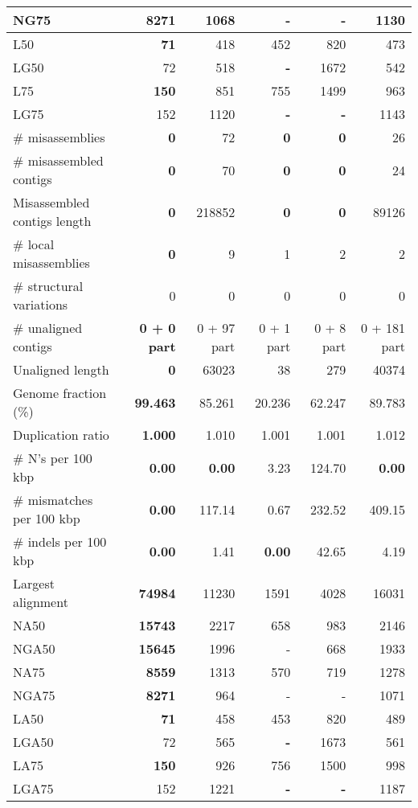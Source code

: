 \documentclass[12pt,a4paper]{article}
\begin{document}
\begin{table}[ht]
\begin{center}
\begin{tabular}{|l*{5}{|r}|}
NG75 & {\bf 8271} & 1068 & - & - & 1130 \\ \hline
L50 & {\bf 71} & 418 & 452 & 820 & 473 \\ \hline
LG50 & 72 & 518 & {\bf -} & 1672 & 542 \\ \hline
L75 & {\bf 150} & 851 & 755 & 1499 & 963 \\ \hline
LG75 & 152 & 1120 & {\bf -} & {\bf -} & 1143 \\ \hline
\# misassemblies & {\bf 0} & 72 & {\bf 0} & {\bf 0} & 26 \\ \hline
\# misassembled contigs & {\bf 0} & 70 & {\bf 0} & {\bf 0} & 24 \\ \hline
Misassembled contigs length & {\bf 0} & 218852 & {\bf 0} & {\bf 0} & 89126 \\ \hline
\# local misassemblies & {\bf 0} & 9 & 1 & 2 & 2 \\ \hline
\# structural variations & 0 & 0 & 0 & 0 & 0 \\ \hline
\# unaligned contigs & {\bf 0 + 0 part} & 0 + 97 part & 0 + 1 part & 0 + 8 part & 0 + 181 part \\ \hline
Unaligned length & {\bf 0} & 63023 & 38 & 279 & 40374 \\ \hline
Genome fraction (\%) & {\bf 99.463} & 85.261 & 20.236 & 62.247 & 89.783 \\ \hline
Duplication ratio & {\bf 1.000} & 1.010 & 1.001 & 1.001 & 1.012 \\ \hline
\# N's per 100 kbp & {\bf 0.00} & {\bf 0.00} & 3.23 & 124.70 & {\bf 0.00} \\ \hline
\# mismatches per 100 kbp & {\bf 0.00} & 117.14 & 0.67 & 232.52 & 409.15 \\ \hline
\# indels per 100 kbp & {\bf 0.00} & 1.41 & {\bf 0.00} & 42.65 & 4.19 \\ \hline
Largest alignment & {\bf 74984} & 11230 & 1591 & 4028 & 16031 \\ \hline
NA50 & {\bf 15743} & 2217 & 658 & 983 & 2146 \\ \hline
NGA50 & {\bf 15645} & 1996 & - & 668 & 1933 \\ \hline
NA75 & {\bf 8559} & 1313 & 570 & 719 & 1278 \\ \hline
NGA75 & {\bf 8271} & 964 & - & - & 1071 \\ \hline
LA50 & {\bf 71} & 458 & 453 & 820 & 489 \\ \hline
LGA50 & 72 & 565 & {\bf -} & 1673 & 561 \\ \hline
LA75 & {\bf 150} & 926 & 756 & 1500 & 998 \\ \hline
LGA75 & 152 & 1221 & {\bf -} & {\bf -} & 1187 \\ \hline
\end{tabular}
\end{center}
\end{table}
\end{document}
